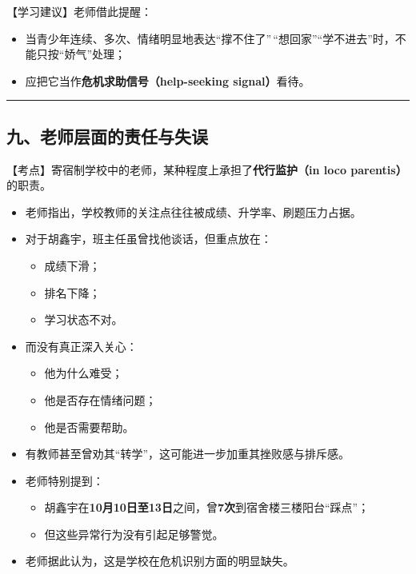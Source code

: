 \documentclass[
  chinese,
  9pt,
  a4paper,
]{ctexart}
\providecommand{\tightlist}{%
  \setlength{\itemsep}{0pt}\setlength{\parskip}{0pt}}
\begin{document}
【学习建议】老师借此提醒：

\begin{itemize}
\tightlist
\item
  当青少年连续、多次、情绪明显地表达``撑不住了''\,``想回家''``学不进去''时，不能只按``娇气''处理；
\item
  应把它当作\textbf{危机求助信号（help-seeking signal）}看待。
\end{itemize}

\begin{center}\rule{0.5\linewidth}{0.5pt}\end{center}

\subsection{九、老师层面的责任与失误}\label{ux4e5dux8001ux5e08ux5c42ux9762ux7684ux8d23ux4efbux4e0eux5931ux8bef}

【考点】寄宿制学校中的老师，某种程度上承担了\textbf{代行监护（in loco
parentis）}的职责。

\begin{itemize}
\item
  老师指出，学校教师的关注点往往被成绩、升学率、刷题压力占据。
\item
  对于胡鑫宇，班主任虽曾找他谈话，但重点放在：

  \begin{itemize}
  \tightlist
  \item
    成绩下滑；
  \item
    排名下降；
  \item
    学习状态不对。
  \end{itemize}
\item
  而没有真正深入关心：

  \begin{itemize}
  \tightlist
  \item
    他为什么难受；
  \item
    他是否存在情绪问题；
  \item
    他是否需要帮助。
  \end{itemize}
\item
  有教师甚至曾劝其``转学''，这可能进一步加重其挫败感与排斥感。
\item
  老师特别提到：

  \begin{itemize}
  \tightlist
  \item
    胡鑫宇在\textbf{10月10日至13日}之间，曾\textbf{7次}到宿舍楼三楼阳台``踩点''；
  \item
    但这些异常行为没有引起足够警觉。
  \end{itemize}
\item
  老师据此认为，这是学校在危机识别方面的明显缺失。
\end{itemize}
\end{document}
